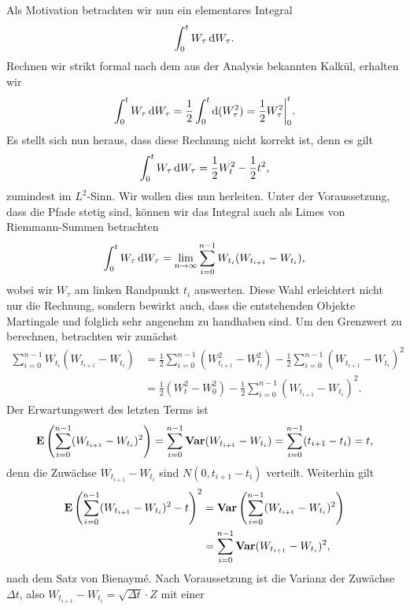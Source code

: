 Als Motivation betrachten wir nun ein elementares Integral
\begin{align*}
\int_0^t W_\tau\, \mathrm{d} W_\tau.
\end{align*}
Rechnen wir strikt formal nach dem aus der Analysis bekannten Kalkül, erhalten
wir
\begin{align*}
\int_0^t W_\tau\, \mathrm{d} W_\tau = \frac{1}{2} \int_0^t \mathrm{d} (W_\tau^2) = 
\frac{1}{2}W_\tau^2\bigg|_{0}^t.
\end{align*}
Es stellt sich nun heraus, dass diese Rechnung nicht korrekt ist, denn es gilt
\begin{align*}
\int_0^t W_\tau\, \mathrm{d} W_\tau = \frac{1}{2} W_t^2 - \frac{1}{2}t^2,
\end{align*}
zumindest im $L^2$-Sinn. Wir wollen dies nun herleiten. 
Unter der Voraussetzung, dass die Pfade stetig sind, können wir das Integral auch als
Limes von Riemmann-Summen betrachten
\begin{align*}
\int_0^t W_\tau\, \mathrm{d} W_\tau = \lim\limits_{n\to \infty} \sum_{i=0}^{n-1}
W_{t_i}(W_{t_{i+1}}-W_{t_i}),
\end{align*}
wobei wir $W_\tau$ am linken Randpunkt $t_i$ auswerten. Diese Wahl
erleichtert nicht nur die Rechnung, sondern bewirkt auch, dass die entstehenden
Objekte Martingale und folglich sehr angenehm zu handhaben sind. Um den
Grenzwert zu berechnen, betrachten wir zunächst
\begin{align*}
\sum_{i=0}^{n-1}
W_{t_i}(W_{t_{i+1}}-W_{t_i}) &=
\frac{1}{2}
\sum_{i=0}^{n-1}
(W_{t_{i+1}}^2-W_{t_i}^2) 
-\frac{1}{2}\sum_{i=0}^{n-1}
(W_{t_{i+1}}-W_{t_i})^2 
\\
&= 
\frac{1}{2}(W_t^2 - W_0^2)-\frac{1}{2}\sum_{i=0}^{n-1}
(W_{t_{i+1}}-W_{t_i})^2.
\end{align*}
Der Erwartungswert des letzten Terms ist
\begin{align*}
\mathbf{E}\left(\sum_{i=0}^{n-1}
(W_{t_{i+1}}-W_{t_i})^2 \right)=
\sum_{i=0}^{n-1} \mathbf{Var} (W_{t_{i+1}}-W_{t_i}) = 
\sum_{i=0}^{n-1} (t_{i+1}-t_i) = t,
\end{align*}
denn die Zuwächse $W_{t_{i+1}}-W_{t_i}$ sind $N(0,t_{i+1}-t_i)$
verteilt. Weiterhin gilt
\begin{align*}
\mathbf{E} \left(\sum_{i=0}^{n-1}
(W_{t_{i+1}}-W_{t_i})^2 - t \right)^2
&= \mathbf{Var} \left(\sum_{i=0}^{n-1}
(W_{t_{i+1}}-W_{t_i})^2 \right)\\
&= 
\sum_{i=0}^{n-1}
\mathbf{Var} (W_{t_{i+1}}-W_{t_i})^2,
\end{align*} 
nach dem Satz von Bienaymé. Nach Voraussetzung ist die Varianz der Zuwächse
$\Delta t$, also $W_{t_{i+1}}-W_{t_i} = \sqrt{\Delta t} \cdot Z$ mit einer 
